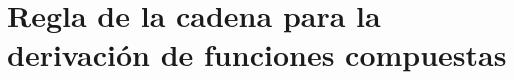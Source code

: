 \begin{comment}
	    \item Expresar $D^*f(x)$ en función de $Df(x)$.\\\\
		Respuesta.-\; Usaremos la idea de $\lim_{h \to 0} f(x+h) = f(x)$, y que $f(x)$ es una constante en $h$, por lo que podemos sacar el límite. 
		$$D^*f(x)=\lim_{h\to 0}\dfrac{f^2(x+h)-f^28x)}{h}=\lim_{h\to 0}\dfrac{\left[f(x+h)+f(x)\right]\left[f(x+h)-f(x)\right]}{h}=2f(x)\cdot Df(x).$$\\


	    \item ¿Para qué funciones es $D^*f=Df$?.\\\\
		Respuesta.-\; Para encontrar la función $f$ tal que $Df=D^*f$ igualamos las dos expresiones y resolvemos $f$ usando $D^*f=2D f$, como sigue
		$$Df=D^*f\quad \Rightarrow \quad Df=2f(x)Df\quad \Rightarrow \quad Df=0\; \mbox{o}\; 2f(x)=1.$$
		En cualquier caso tenemos $f(x)=c$ para alguna constante $c$.\\\\

	\end{enumerate}

\end{enumerate}

\end{comment}

\section{Regla de la cadena para la derivación de funciones compuestas}

